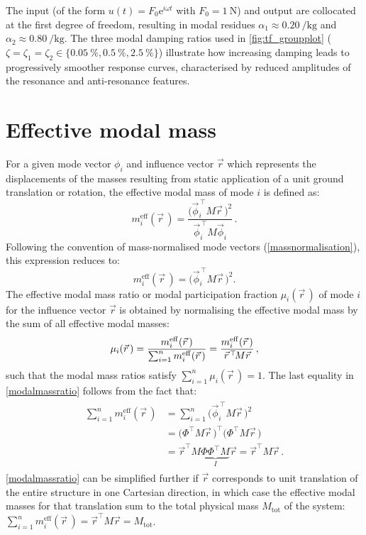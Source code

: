 \documentclass[../Thesis-IJspeert.tex]{subfiles}
\begin{document}
The input (of the form $u(t)=F_0\mathrm{e}^{i \omega t}$ with $F_0=\SI{1}{\newton}$) and output are collocated at the first degree of freedom, resulting in modal residues $\alpha_1 \approx \SI{0.20}{\per\kilogram}$ and $\alpha_2 \approx \SI{0.80}{\per\kilogram}$. The three modal damping ratios used in \autoref{fig:tf_groupplot} ($\zeta =\zeta_1=\zeta_2\in \{\SI{0.05}{\percent}, \SI{0.5}{\percent},\SI{2.5}{\percent}\}$) illustrate how increasing damping leads to progressively smoother response curves, characterised by reduced amplitudes of the resonance and anti-resonance features.

\section{Effective modal mass}
For a given mode vector $\phi_i$ and influence vector $\vec{r}$ which represents the displacements of the masses resulting from static application of a unit ground translation or rotation, the effective modal mass of mode $i$ is defined as:
\begin{equation}
m_i^{\mathrm{eff}}(\vec{r}\,) = \frac{\bigl(\vec{\phi}_i^{\,\top} \!M \vec{r}\,\bigr)^2}{\vec{\phi}_i^{\,\top} \!M \vec{\phi}_i}\,.
\end{equation}
Following the convention of mass-normalised mode vectors (\autoref{massnormalisation}), this expression reduces to:
\begin{equation}
m_i^{\mathrm{eff}}(\vec{r}\,) = \bigl(\vec{\phi}_i^{\,\top} \!M \vec{r}\,\bigr)^2 .
\end{equation}
The effective modal mass ratio or modal participation fraction $\mu_i(\vec{r}\,)$ of mode $i$ for the influence vector $\vec{r}$ is obtained by normalising the effective modal mass by the sum of all effective modal masses:
\begin{equation}
\label{modalmassratio}
\mu_i(\vec{r}\,) = \frac{m_i^{\mathrm{eff}}(\vec{r}\,)}{\sum_{i=1}^{n} m_i^{\mathrm{eff}}(\vec{r}\,)} = \frac{m_i^{\mathrm{eff}}(\vec{r}\,)}{\vec{r}^{\hspace{0.1em}\top}\!M\vec{r}}\,,
\end{equation}
such that the modal mass ratios satisfy $\sum_{i=1}^{n} \mu_i(\vec{r}\,)=1$. The last equality in \autoref{modalmassratio} follows from the fact that:
\begin{align}
\begin{split}
\sum_{i=1}^{n} m_i^{\mathrm{eff}}(\vec{r}\,)
&=\sum_{i=1}^{n} \bigl(\vec{\phi}_i^{\,\top}\!M\vec{r}\,\bigr)^2\\
&= \bigl(\Phi^{\!\top}\!M\vec{r}\,\bigr)^{\!\top}\bigl(\Phi^{\!\top}\!M\vec{r}\,\bigr)\\
&= \vec{r}^{\top} \!M \underbrace{\Phi\Phi^{\!\top} M}_{I} \vec{r}
= \vec{r}^{\top}\!M\vec{r}\,.
\end{split}
\end{align}
\autoref{modalmassratio} can be simplified further if $\vec{r}$ corresponds to unit translation of the entire structure in one Cartesian direction, in which case the effective modal masses for that translation sum to the total physical mass $M_\mathrm{tot}$ of the system: $\sum_{i=1}^{n} m_i^{\mathrm{eff}}(\vec{r}\,)=\vec{r}^{\top}\!M\vec{r}=M_{\mathrm{tot}}$.
\end{document}
